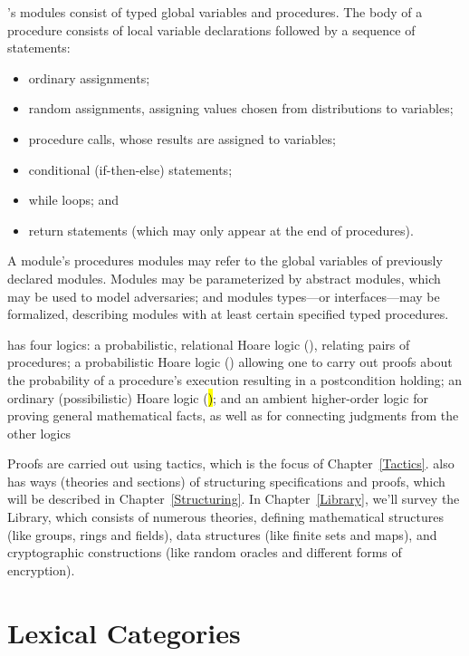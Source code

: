 \EasyCrypt's modules consist of typed global variables and procedures.
The body of a procedure consists of local variable declarations followed
by a sequence of statements:
\begin{itemize}
\item ordinary assignments;

\item random assignments, assigning values chosen
  from distributions to variables;

\item procedure calls, whose results are assigned to variables;

\item conditional (if-then-else) statements;

\item while loops; and

\item return statements (which may only appear at the end of
  procedures).
\end{itemize}
A module's procedures modules may refer to the global variables of
previously declared modules. Modules may be parameterized by abstract
modules, which may be used to model adversaries; and modules
types---or interfaces---may be formalized, describing modules with at
least certain specified typed procedures.

\EasyCrypt has four logics: a probabilistic, relational Hoare logic
(\prhl), relating pairs of procedures; a probabilistic Hoare logic
(\phl) allowing one to carry out proofs about the probability of a
procedure's execution resulting in a postcondition holding; an
ordinary (possibilistic) Hoare logic (\hl); and an ambient
higher-order logic for proving general mathematical facts, as well as
for connecting judgments from the other logics

Proofs are carried out using tactics, which is the focus of
Chapter~\ref{Tactics}.  \EasyCrypt also has ways (theories and
sections) of structuring specifications and proofs, which will be
described in Chapter~\ref{Structuring}. In Chapter~\ref{Library},
we'll survey the \EasyCrypt Library, which consists of numerous
theories, defining mathematical structures (like groups, rings
and fields), data structures (like finite sets and maps), and
cryptographic constructions (like random oracles and different
forms of encryption).

\section{Lexical Categories}
\label{Lexical}

